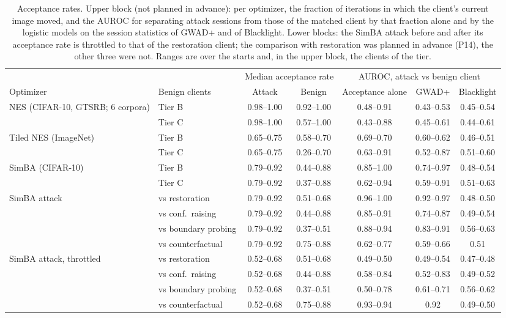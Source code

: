 \begin{table}[!tbp]
\centering\footnotesize\setlength{\tabcolsep}{4pt}
\caption{Acceptance rates. Upper block (not planned in advance): per optimizer, the fraction of iterations in which the client's current image moved, and the AUROC for separating attack sessions from those of the matched client by that fraction alone and by the logistic models on the session statistics of GWAD+ and of Blacklight. Lower blocks: the SimBA attack before and after its acceptance rate is throttled to that of the restoration client; the comparison with restoration was planned in advance (P14), the other three were not. Ranges are over the starts and, in the upper block, the clients of the tier.}
\label{tab:leak}
\vspace{3pt}
\begin{adjustbox}{max width=\textwidth}
\begin{tabular}{llccccc}
\toprule
& & \multicolumn{2}{c}{Median acceptance rate} & \multicolumn{3}{c}{AUROC, attack vs benign client} \\
\cmidrule(lr){3-4}\cmidrule(lr){5-7}
Optimizer & Benign clients & Attack & Benign & Acceptance alone & GWAD+ & Blacklight \\
\midrule
NES (CIFAR-10, GTSRB; 6 corpora) & Tier B & 0.98--1.00 & 0.92--1.00 & 0.48--0.91 & 0.43--0.53 & 0.45--0.54 \\
 & Tier C & 0.98--1.00 & 0.57--1.00 & 0.43--0.88 & 0.45--0.61 & 0.44--0.61 \\
Tiled NES (ImageNet) & Tier B & 0.65--0.75 & 0.58--0.70 & 0.69--0.70 & 0.60--0.62 & 0.46--0.51 \\
 & Tier C & 0.65--0.75 & 0.26--0.70 & 0.63--0.91 & 0.52--0.87 & 0.51--0.60 \\
SimBA (CIFAR-10) & Tier B & 0.79--0.92 & 0.44--0.88 & 0.85--1.00 & 0.74--0.97 & 0.48--0.54 \\
 & Tier C & 0.79--0.92 & 0.37--0.88 & 0.62--0.94 & 0.59--0.91 & 0.51--0.63 \\[2pt]
SimBA attack & vs restoration & 0.79--0.92 & 0.51--0.68 & 0.96--1.00 & 0.92--0.97 & 0.48--0.50 \\
 & vs conf.\ raising & 0.79--0.92 & 0.44--0.88 & 0.85--0.91 & 0.74--0.87 & 0.49--0.54 \\
 & vs boundary probing & 0.79--0.92 & 0.37--0.51 & 0.88--0.94 & 0.83--0.91 & 0.56--0.63 \\
 & vs counterfactual & 0.79--0.92 & 0.75--0.88 & 0.62--0.77 & 0.59--0.66 & 0.51 \\[2pt]
SimBA attack, throttled & vs restoration & 0.52--0.68 & 0.51--0.68 & 0.49--0.50 & 0.49--0.54 & 0.47--0.48 \\
 & vs conf.\ raising & 0.52--0.68 & 0.44--0.88 & 0.58--0.84 & 0.52--0.83 & 0.49--0.52 \\
 & vs boundary probing & 0.52--0.68 & 0.37--0.51 & 0.50--0.78 & 0.61--0.71 & 0.56--0.62 \\
 & vs counterfactual & 0.52--0.68 & 0.75--0.88 & 0.93--0.94 & 0.92 & 0.49--0.50 \\
\bottomrule
\end{tabular}
\end{adjustbox}
\end{table}
